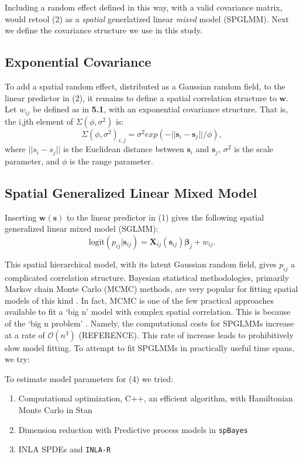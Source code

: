 \documentclass{article}
\begin{document}
Including a random effect defined in this way, with a valid covariance matrix, would retool (2) as a {\it spatial} generlatized linear {\it mixed} model (SPGLMM). Next we define the covariance structure we use in this study.

\subsection{Exponential Covariance}
To add a spatial random effect, distributed as a Gaussian random field, to the linear predictor in (2), it remains to define a spatial correlation structure to $\pmb{w}$. Let $w_{ij}$ be defined as in {\bf 5.1}, with an exponential covariance structure. That is, the i,jth element of $\Sigma(\phi, \sigma^{2})$ is:
\begin{equation}
\Sigma(\phi, \sigma^{2})_{i,j} = \sigma^{2} exp(-||\pmb{s}_{i} - \pmb{s}_{j}||/\phi),
\end{equation}
where $||s_{i} - s_{j}||$ is the Euclidean distance between $\pmb{s}_{i}$ and $\pmb{s}_{j}$, $\sigma^{2}$ is the scale parameter, and $\phi$ is the range parameter.

\subsection{Spatial Generalized Linear Mixed Model}
Inserting $\pmb{w}(\pmb{s})$ to the linear predictor in (1) gives the following spatial generalized linear mixed model (SGLMM):
\begin{equation}
\text{logit}(p_{ij}|\pmb{s}_{ij}) = \pmb{X}_{ij}(\pmb{s}_{ij}) \pmb{\beta}_{j} + w_{ij}.
\end{equation}

This spatial hierarchical model, with its latent Gaussian random field, gives $p_{ij}$ a complicated correlation structure. Bayesian statistical methodologies, primarily Markov chain Monte Carlo (MCMC) methods, are very popular for fitting spatial models of this kind \citep{Banerjee2014}. In fact, MCMC is one of the few practical approaches available to fit a `big n' model with complex spatial correlation. This is because of the `big n problem' \citep{Lindgren2011}. Namely, the computational costs for SPGLMMs increase at a rate of $\mathcal{O}(n^{3})$ (REFERENCE). This rate of increase leads to prohibitively slow model fitting. To attempt to fit SPGLMMs in practically useful time spans, we try: 

To estimate model parameters for (4) we tried:
\begin{enumerate}
\item Computational optimization, C++, an efficient algorithm, with Hamiltonian Monte Carlo in Stan
\item Dimension reduction with Predictive process models in \verb|spBayes|
\item INLA SPDEs and \verb|INLA-R|
\end{enumerate}
\end{document}
